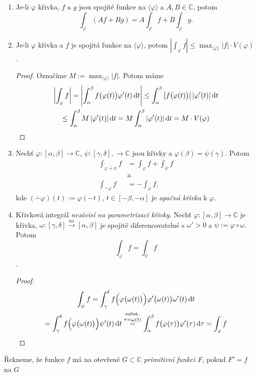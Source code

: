 \begin{propertiesBasic}
\mbox{}
\vspace{-2em}
\begin{enumerate}
    \item Je-li $\varphi$ křivka, $f$ a $g$ jsou spojité funkce na $\langle\varphi\rangle$ a $A,B \in \mathbb{C}$, potom $$\int_\varphi (Af+Bg)=A\int_\varphi f+B\int_\varphi g.$$
    \item Je-li $\varphi$ křivka a $f$ je spojitá funkce na $\langle\varphi\rangle$, potom $\left|\int_\varphi f\right|\leq\max_{\langle\varphi\rangle}|f|\cdot V(\varphi)$.
    \begin{proof}
     Označíme $M:=\max_{\langle\varphi\rangle}|f|$. Potom máme
     \begin{multline*}
     \left|\int_\varphi f\right|=
     \left| \int_\alpha^\beta f\bigl(\varphi(t)\bigr) \varphi'(t) \mathop{}\!\mathrm{d} t \right|
     \leq\int_\alpha^\beta\left|f\bigl(\varphi(t)\bigr)\right|\left|\varphi'(t)\right|\mathop{}\!\mathrm{d} t\\
     \leq\int_\alpha^\beta M\left|\varphi'(t)\right|\mathop{}\!\mathrm{d} t =M\int_\alpha^\beta \left|\varphi'(t)\right|\mathop{}\!\mathrm{d} t
     = M\cdot V(\varphi)
     \end{multline*}
    \end{proof}
    \item Nechť $\varphi:[\alpha,\beta]\rightarrow\mathbb{C}$, $\psi:[\gamma,\delta],\rightarrow\mathbb{C}$ jsou křivky a $\varphi(\beta)=\psi(\gamma)$. Potom 
    \begin{align*}
        \int_{\varphi\dotplus\psi}f&=\int_\varphi f+\int_\psi f \\ 
        &\text{a} \\
        \int_{\dotminus \varphi}f&=-\int_\varphi f\text{,}
    \end{align*}
    kde $(\dotminus \varphi)(t):=\varphi(-t)$, $t\in[-\beta,-\alpha]$ je \emph{opačná křivka} k $\varphi$.
    \item Křivková integrál \emph{nezávisí na parametrizaci křivky}. Nechť $\varphi:[\alpha,\beta]\rightarrow\mathbb{C}$ je křivka, $\omega:[\gamma,\delta]\xrightarrow{\text{na}}[\alpha,\beta]$ je spojitě diferencovatelné s $\omega'>0$ a $\psi:=\varphi\circ\omega$. Potom $$\int_\varphi f = \int_\psi f$$.
    \begin{proof}
    \begin{multline*}
        \int_\psi f=
    \int_\gamma^\delta f\Bigl(\varphi\bigl(\omega(t)\bigr)\Bigr) \varphi'\bigl(\omega(t)\bigr)\omega'(t)\mathop{}\!\mathrm{d} t\\
    =\int_\gamma^\delta f\Bigl(\varphi\bigl(\omega(t)\bigr)\Bigr)\psi'(t)\mathop{}\!\mathrm{d} t \stackrel{\text{subst.}}{\stackrel{\tau=\omega(t)}{=}}
    \int_\alpha^\beta f\bigl(\varphi(\tau)\bigr) \varphi'(\tau)\mathop{}\!\mathrm{d} \tau=\int_\varphi f  
    \end{multline*}
    \end{proof}
\end{enumerate}
\end{propertiesBasic}
\begin{definition}
Řekneme, že funkce $f$ má na otevřené $G\subset\mathbb{C}$ \emph{primitivní funkci F}, pokud $F'=f$ na $G$
\end{definition}

